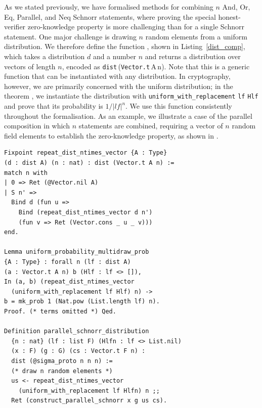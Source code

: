 \documentclass[sigconf, anonymous]{acmart}
\begin{document}
As we stated previously, we have formalised methods for combining $n$ And, Or, Eq, Parallel, and Neq Schnorr statements, where proving the special honest-verifier zero-knowledge property is more challenging than for a single Schnorr statement. One major challenge is drawing $n$ random elements from a uniform distribution. We therefore define the function \texttt{}, shown in Listing~\ref{dist_comp}, which takes a distribution $d$ and a number $n$ and returns a distribution over vectors of length $n$, encoded as \texttt{dist}\,(\texttt{Vector.t}\,A\,n). Note that this is a generic function that can be instantiated with any distribution. In cryptography, however, we are primarily concerned with the uniform distribution; in the theorem \texttt{}, we instantiate the distribution with \texttt{uniform\_with\_replacement} \texttt{lf} \texttt{Hlf} and prove that its probability is $1/|lf|^n$. We use this function consistently throughout the formalisation. As an example, we illustrate a case of the parallel composition in which $n$ statements are combined, requiring a vector of $n$ random field elements to establish the zero-knowledge property, as shown in \texttt{}.


\begin{lstlisting}[frame=single, language=Coq, caption={Composition of a Distribution},
label={dist_comp},captionpos=t, basicstyle=\ttfamily\footnotesize,
abovecaptionskip=-\medskipamount]
Fixpoint repeat_dist_ntimes_vector {A : Type} 
(d : dist A) (n : nat) : dist (Vector.t A n) := 
match n with 
| 0 => Ret (@Vector.nil A)
| S n' => 
  Bind d (fun u => 
    Bind (repeat_dist_ntimes_vector d n')
    (fun v => Ret (Vector.cons _ u _ v)))
end.

Lemma uniform_probability_multidraw_prob 
{A : Type} : forall n (lf : dist A) 
(a : Vector.t A n) b (Hlf : lf <> []), 
In (a, b) (repeat_dist_ntimes_vector 
  (uniform_with_replacement lf Hlf) n) ->
b = mk_prob 1 (Nat.pow (List.length lf) n).
Proof. (* terms omitted *) Qed.

Definition parallel_schnorr_distribution  
  {n : nat} (lf : list F) (Hlfn : lf <> List.nil) 
  (x : F) (g : G) (cs : Vector.t F n) : 
  dist (@sigma_proto n n n) :=
  (* draw n random elements *)
  us <- repeat_dist_ntimes_vector 
    (uniform_with_replacement lf Hlfn) n ;;
  Ret (construct_parallel_schnorr x g us cs).
\end{lstlisting}
\end{document}
